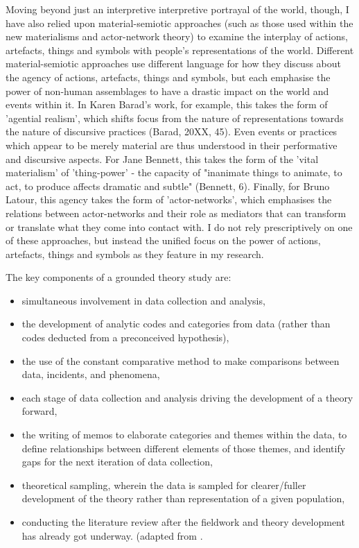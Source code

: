 Moving beyond just an interpretive interpretive portrayal of the world, though, I have also relied upon material-semiotic approaches (such as those used within the new materialisms and actor-network theory) to examine the interplay of actions, artefacts, things and symbols with people's representations of the world. Different material-semiotic approaches use different language for how they discuss about the agency of actions, artefacts, things and symbols, but each emphasise the power of non-human assemblages to have a drastic impact on the world and events within it. In Karen Barad's work, for example, this takes the form of 'agential realism', which shifts focus from the nature of representations towards the nature of discursive practices (Barad, 20XX, 45). Even events or practices which appear to be merely material are thus understood in their performative and discursive aspects. For Jane Bennett, this takes the form of the 'vital materialism' of 'thing-power' - the capacity of "inanimate things to animate, to act, to produce affects dramatic and subtle" (Bennett, 6). Finally,  for Bruno Latour, this agency takes the form of 'actor-networks', which emphasises the relations between actor-networks and their role as mediators that can transform or translate what they come into contact with. I do not rely prescriptively on one of these approaches, but instead the unified focus on the power of actions, artefacts, things and symbols as they feature in my research. 


The key components of a grounded theory study are:
\begin{itemize}
    \item simultaneous involvement in data collection and analysis,
    \item the development of analytic codes and categories from data (rather than codes deducted from a preconceived hypothesis),
    \item the use of the constant comparative method to make comparisons between data, incidents, and phenomena,
    \item each stage of data collection and analysis driving the development of a theory forward,
    \item the writing of memos to elaborate categories and themes within the data, to define relationships between different elements of those themes, and identify gaps for the next iteration of data collection,
    \item theoretical sampling, wherein the data is sampled for clearer/fuller development of the theory rather than representation of a given population,
    \item conducting the literature review after the fieldwork and theory development has already got underway. (adapted from \cite[5-6]{charmaz_constructing_2006}.
\end{itemize}
 

